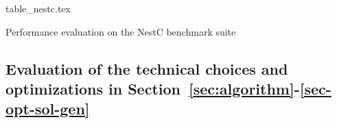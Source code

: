 \begin{table}[htbp]
  \centering\vskip 0pt
    {table_nestc.tex}
    \caption{Performance evaluation on the NestC benchmark suite}
  \label{tab:table_nestc_eval}
\end{table}





\subsection{Evaluation of the technical choices and optimizations in Section~\ref{sec:algorithm}-\ref{sec-opt-sol-gen}}\label{subsec:size_reduction_eval}

